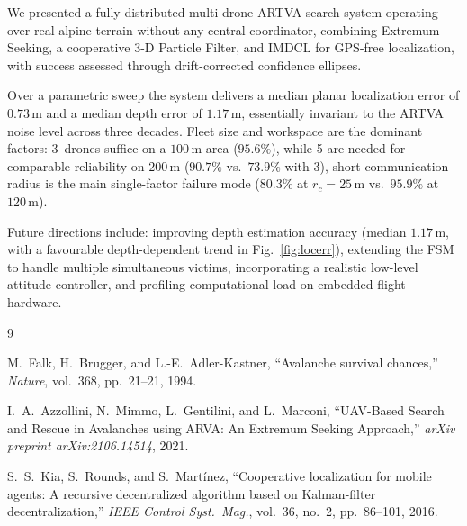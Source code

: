 \documentclass[journal,10pt,twocolumn]{IEEEtran}
\begin{document}
We presented a fully distributed multi-drone ARTVA search system
operating over real alpine terrain without any central coordinator,
combining Extremum Seeking, a cooperative 3-D Particle Filter, and
IMDCL for GPS-free localization, with success assessed through
drift-corrected confidence ellipses.

Over a parametric sweep the system delivers a median
planar localization error of $0.73$\,m and a median depth error of
$1.17$\,m, essentially invariant to the ARTVA noise level across
three decades.  Fleet size and workspace are the dominant factors:
3~drones suffice on a $100$\,m area ($95.6\%$), while 5 are needed
for comparable reliability on $200$\,m ($90.7\%$ vs.\ $73.9\%$ with
3), short communication radius is the main single-factor failure mode
($80.3\%$ at $r_c=25$\,m vs.\ $95.9\%$ at $120$\,m).

Future directions include: improving depth estimation accuracy (median
$1.17$\,m, with a favourable depth-dependent trend in
Fig.~\ref{fig:locerr}), extending the FSM to handle multiple
simultaneous victims, incorporating a realistic low-level attitude
controller, and profiling computational load on embedded
flight hardware.

\begin{thebibliography}{9}

M.~Falk, H.~Brugger, and L.-E.~Adler-Kastner,
``Avalanche survival chances,''
\emph{Nature}, vol.\ 368, pp.\ 21--21, 1994.

I.~A.~Azzollini, N.~Mimmo, L.~Gentilini, and L.~Marconi,
``UAV-Based Search and Rescue in Avalanches using ARVA:
  An Extremum Seeking Approach,''
\emph{arXiv preprint arXiv:2106.14514}, 2021.

S.~S.~Kia, S.~Rounds, and S.~Mart\'inez,
``Cooperative localization for mobile agents: A recursive decentralized
  algorithm based on Kalman-filter decentralization,''
\emph{IEEE Control Syst.\ Mag.}, vol.\ 36, no.\ 2, pp.\ 86--101, 2016.

\end{thebibliography}
\end{document}
